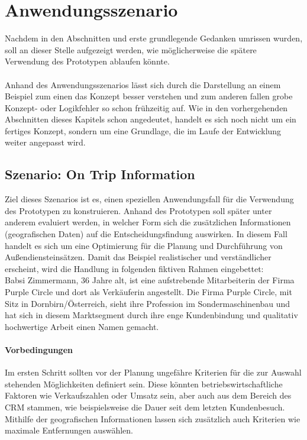 \documentclass[Bachelorarbeit.tex]{subfiles}
\begin{document}
\section{Anwendungsszenario}
\label{sec:anwendungsszenario}
Nachdem in den Abschnitten  und  erste grundlegende Gedanken umrissen wurden, soll an dieser Stelle aufgezeigt werden, wie möglicherweise die spätere Verwendung des Prototypen ablaufen könnte.\\
\\
Anhand des Anwendungsszenarios lässt sich durch die Darstellung an einem Beispiel zum einen das Konzept besser verstehen und zum anderen fallen grobe Konzept- oder Logikfehler so schon frühzeitig auf.
Wie in den vorhergehenden Abschnitten dieses Kapitels schon angedeutet, handelt es sich noch nicht um ein fertiges Konzept, sondern um eine Grundlage, die im Laufe der Entwicklung weiter angepasst wird.

\subsection{Szenario: On Trip Information }
Ziel dieses Szenarios ist es, einen speziellen Anwendungsfall für die Verwendung des Prototypen zu konstruieren. 
Anhand des Prototypen soll später unter anderem evaluiert werden, in welcher Form sich die zusätzlichen Informationen (geografischen Daten) auf die Entscheidungsfindung auswirken.
In diesem Fall handelt es sich um eine Optimierung für die Planung und Durchführung von Außendiensteinsätzen.
Damit das Beispiel realistischer und verständlicher erscheint, wird die Handlung in folgenden fiktiven Rahmen eingebettet:\\

Babsi Zimmermann, 36 Jahre alt, ist eine aufstrebende Mitarbeiterin der Firma Purple Circle und dort als Verkäuferin angestellt. 
Die Firma Purple Circle, mit Sitz in Dornbirn/Österreich, sieht ihre Profession im Sondermaschinenbau und hat sich in diesem Marktsegment durch ihre enge Kundenbindung und qualitativ hochwertige Arbeit einen Namen gemacht. 


\paragraph*{Vorbedingungen}
Im ersten Schritt sollten vor der Planung ungefähre Kriterien für die zur Auswahl stehenden Möglichkeiten definiert sein.
Diese könnten betriebswirtschaftliche Faktoren wie Verkaufszahlen oder Umsatz sein, aber auch aus dem Bereich des \ac{CRM} stammen, wie beispielsweise die Dauer seit dem letzten Kundenbesuch.
Mithilfe der geografischen Informationen lassen sich zusätzlich auch Kriterien wie maximale Entfernungen auswählen.
\end{document}
